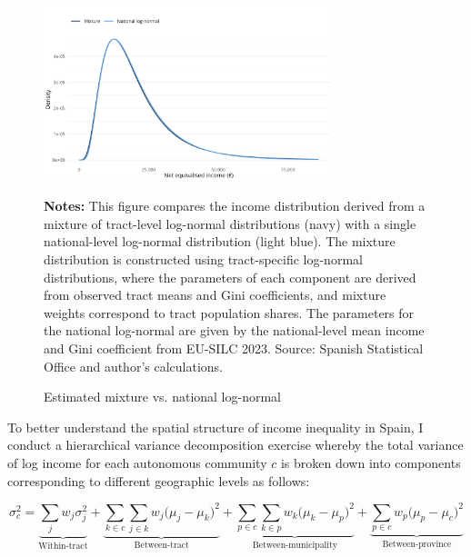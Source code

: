 \begin{figure}[H]
\begin{center}
\captionsetup{justification=centering}
\caption{Estimated mixture vs. national log-normal}\label{fig:dist2}
\includegraphics[width=0.75\textwidth]{output/tract_vs_national_income_distribution.png}
\end{center}
\begin{fignotes2}
\textbf{Notes:} This figure compares the income distribution derived from a mixture of tract-level log-normal distributions (navy) with a single national-level log-normal distribution (light blue). The mixture distribution is constructed using tract-specific log-normal distributions, where the parameters of each component are derived from observed tract means and Gini coefficients, and mixture weights correspond to tract population shares. The parameters for the national log-normal are given by the national-level mean income and Gini coefficient from EU-SILC 2023. Source: Spanish Statistical Office and author's calculations.
\end{fignotes2}
\end{figure}

To better understand the spatial structure of income inequality in Spain, I conduct a hierarchical variance decomposition exercise whereby the total variance of log income for each autonomous community $c$ is broken down into components corresponding to different geographic levels as follows:

\begin{equation}
\sigma^2_{c} = 
\underbrace{\sum_{j} w_j \sigma^2_{j}}_{\text{Within-tract}} + 
\underbrace{\sum_{k \in c} \sum_{j \in k} w_j \big( \mu_{j} - \mu_{k} \big)^2}_{\text{Between-tract}} + 
\underbrace{\sum_{p \in c} \sum_{k \in p} w_k \big( \mu_{k} - \mu_{p} \big)^2}_{\text{Between-municipality}} + 
\underbrace{\sum_{p \in c} w_p \big( \mu_{p} - \mu_{c} \big)^2}_{\text{Between-province}}
\end{equation}

